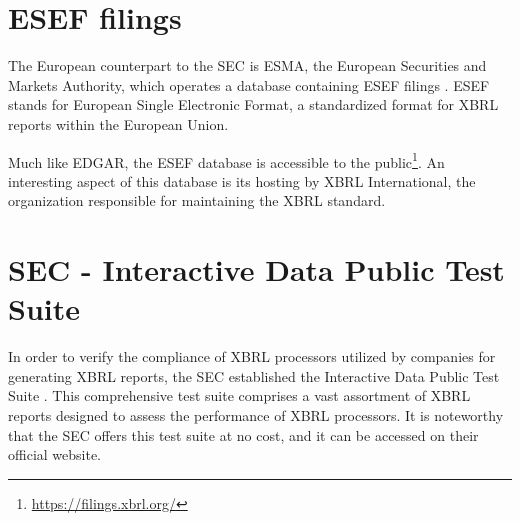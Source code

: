 \section{ESEF filings}
The European counterpart to the SEC is ESMA, 
the European Securities and Markets Authority, 
which operates a database containing ESEF filings \cite{esma_database}. 
ESEF stands for European Single Electronic Format, 
a standardized format for XBRL reports within the European Union.

Much like EDGAR, the ESEF database is accessible to the public\footnote{\url{https://filings.xbrl.org/}}. 
An interesting aspect of this database is its hosting by XBRL International, the organization responsible for maintaining the XBRL standard.

\section{SEC - Interactive Data Public Test Suite}
\label{sec:idpts}
In order to verify the compliance of XBRL processors utilized by companies for generating XBRL reports, 
the SEC established the Interactive Data Public Test Suite \cite{sec_idpts}. 
This comprehensive test suite comprises a vast assortment of XBRL reports designed to assess the performance of XBRL processors.
It is noteworthy that the SEC offers this test suite at no cost, and it can be accessed on their official website.

